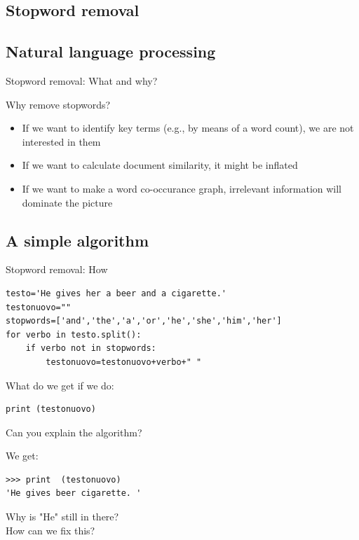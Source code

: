 \documentclass{beamer}
\begin{document}
\subsection[Stopword removal]{Stopword removal}

\subsection{Natural language processing}
\begin{frame}{Stopword removal: What and why?}
	\begin{block}{Why remove stopwords?}
		\begin{itemize}
			\item If we want to identify key terms (e.g., by means of a word count), we are not interested in them
			\item If we want to calculate document similarity, it might be inflated
			\item If we want to make a word co-occurance graph, irrelevant information will dominate the picture
		\end{itemize}
	\end{block}
\end{frame}

\subsection{A simple algorithm}

\begin{frame}[fragile]{Stopword removal: How}
\begin{lstlisting}
testo='He gives her a beer and a cigarette.'
testonuovo=""
stopwords=['and','the','a','or','he','she','him','her']
for verbo in testo.split():
    if verbo not in stopwords:
        testonuovo=testonuovo+verbo+" "
\end{lstlisting}
What do we get if we do:
\begin{lstlisting}
print (testonuovo)
\end{lstlisting}
Can you explain the algorithm?
\end{frame}




\begin{frame}[fragile]{We get:}
\begin{lstlisting}
>>> print  (testonuovo)
'He gives beer cigarette. '
\end{lstlisting}
Why is "He" still in there? \\ How can we fix this?
\end{frame}
\end{document}
